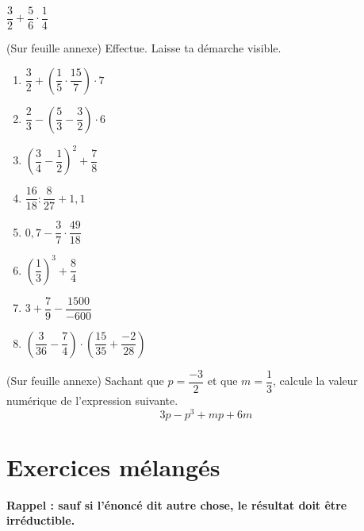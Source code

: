\documentclass[../../syllabus_2.tex]{subfiles}
\begin{document}
\exemple $\dfrac{3}{2} + \dfrac{5}{6} \cdot \dfrac{1}{4}$
\vspace*{4cm}

\begin{exercise}
  (Sur feuille annexe) Effectue. Laisse ta démarche visible.
  \begin{enumerate}[cols=2]
    \item $\dfrac{3}{2}+\left(\dfrac{1}{5}\cdot \dfrac{15}{7}\right)\cdot 7$
    \item $\dfrac{2}{3}-\left(\dfrac{5}{3}-\dfrac{3}{2}\right)\cdot 6$
    \item $\left(\dfrac{3}{4}-\dfrac{1}{2}\right)^2+\dfrac{7}{8}$
    \item $\dfrac{16}{18} : \dfrac{8}{27}+1,1$
    \item $0,7-\dfrac{3}{7} \cdot \dfrac{49}{18}$
    \item $\left(\dfrac{1}{3}\right)^3 + \dfrac{8}{4}$
    \item $3+\dfrac{7}{9}-\dfrac{1500}{-600}$
    \item $\left(\dfrac{3}{36}-\dfrac{7}{4}\right) \cdot \left(\dfrac{15}{35}+\dfrac{-2}{28}\right)$
  \end{enumerate}
\end{exercise}


\begin{exercise}
  (Sur feuille annexe) Sachant que $p=\dfrac{-3}{2}$ et que $m=\dfrac{1}{3}$, calcule la valeur numérique de l'expression suivante.
  \vspace{0.5cm} %
  \[3p-p^3+mp+6m\]
\end{exercise}

\newpage
\section{Exercices mélangés}
\setcounter{exercise}{0}
\textbf{Rappel : sauf si l'énoncé dit autre chose, le résultat doit être irréductible.}
\end{document}
